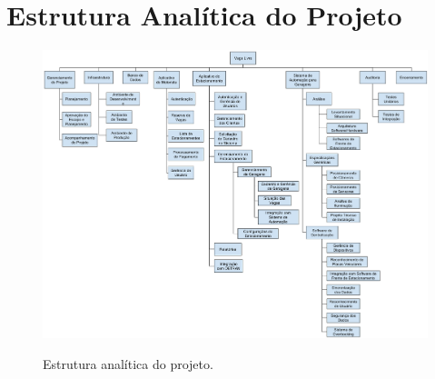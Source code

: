 
\chapter{Estrutura Analítica do Projeto}\label{ch:wbs}

%

\begin{figure}[h]
	\includegraphics[height=.9\textwidth,angle=90]{images/wbs}
	\label{img:wbs}
	\caption{Estrutura analítica do projeto.}
\end{figure}